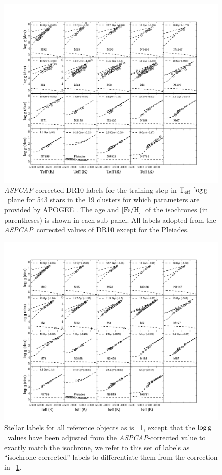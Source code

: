 \documentclass[12pt, preprint]{aastex}
\newcommand{\aspcap}{\textsl{ASPCAP}}
\newcommand{\teff}{\mbox{$\rm T_{eff}$}}
\newcommand{\feh}{\mbox{$\rm [Fe/H]$}}
\newcommand{\logg}{\mbox{$\rm \log g$}}
\begin{document}
\begin{figure}[h!]
\centering
    \includegraphics[scale=0.33]{./plots/training_aspcap.pdf}
\caption{\aspcap-corrected DR10 labels  for the training step in \teff-\logg\ plane for 543 stars in the 19 clusters for which parameters are provided by APOGEE \citep{Meszaros2013}. The age and \feh\ of the isochrones (in parentheses) is shown in each sub-panel. All labels adopted from the \aspcap\ corrected values of DR10 except for the Pleiades. }
\label{fig:trainingaspcap}
\end{figure}

\begin{figure}[h!]
\centering
  \includegraphics[scale=0.33]{./plots/training_mkn2.pdf}
\caption{Stellar labels for all reference objects as is \figurename~\ref{fig:trainingaspcap}, except that the \logg\ values have been adjusted from the \aspcap-corrected value to exactly match the isochrone, we refer to this set of labels as  ``isochrone-corrected'' labels to differentiate them from the correction in \figurename~\ref{fig:trainingaspcap}.  }
\label{fig:trainingisochrone}
\end{figure}
\end{document}
